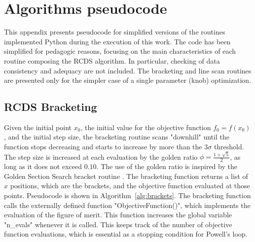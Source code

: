 \chapter{Algorithms pseudocode}
\label{chap:pseudocode}
This appendix presents pseudocode for simplified versions of the routines implemented Python during the execution of this work. The code has been simplified for pedagogic reasons, focusing on the main characteristics of each routine composing the RCDS algorithm. In particular, checking of data consistency and adequacy are not included. The bracketing and line scan routines are presented only for the simpler case of a single parameter (knob) optimization.
\section{RCDS Bracketing}
Given the initial point $x_0$, the initial value for the objective function $f_0 = f(x_0)$, and the initial step size, the bracketing routine scans "downhill" until the function stops decreasing and starts to increase by more than the $3\sigma$ threshold. The step size is increased at each evaluation by the golden ratio $\phi=\frac{1+\sqrt{5}}{2}$, as long as it does not exceed $0.10$. The use of the golden ratio is inspired by the Golden Section Search bracket routine \cite[sec. 10.2]{press_numerical_2007}. The bracketing function returns a list of $x$ positions, which are the brackets, and the objective function evaluated at those points. Pseudocode is shown in Algorithm~\ref{alg:brackets}. The bracketing function calls the externally defined function "ObjectiveFunction()", which implements the evaluation of the figure of merit. This function increases the global variable "n\_evals" whenever it is called. This keeps track of the number of objective function evaluations, which is essential as a stopping condition for Powell's loop.

